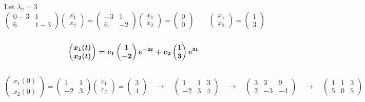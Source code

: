 \documentclass[12pt]{article}
\begin{document}
Let $\lambda_2 = 3$
$$\begin{pmatrix}
	0 - 3  & 1 \\
	6 & 1 - 3
\end{pmatrix}
\begin{pmatrix}
	x_1 \\
	x_2
\end{pmatrix} = 
\begin{pmatrix}
	-3 & 1 \\
	6 & -2
\end{pmatrix}
\begin{pmatrix}
	x_1 \\
	x_2
\end{pmatrix} = 
\begin{pmatrix}
	0 \\
	0
\end{pmatrix} \qquad 
\begin{pmatrix}
	x_1 \\
	x_2
\end{pmatrix} = 
\begin{pmatrix}
	1 \\
	3
\end{pmatrix}$$ \\
$$
\boldmath
\begin{pmatrix}
	x_1(t) \\
	x_2(t)
\end{pmatrix} = 
c_1
\begin{pmatrix}
	1 \\
	-2
\end{pmatrix}
e^{-2t} + 
c_2
\begin{pmatrix}
	1 \\
	3
\end{pmatrix}
e^{3t}
$$
\\
$$
\begin{pmatrix}
x_1(0) \\
x_2(0)
\end{pmatrix} = 
\begin{pmatrix}
	1 & 1 \\
	-2 & 3
\end{pmatrix}
\begin{pmatrix}
	c_1 \\
	c_2	
\end{pmatrix} =
\begin{pmatrix}
	3 \\
	4
\end{pmatrix}
\quad \rightarrow \quad
\begin{pmatrix}
	1 & 1 & 3\\
	-2 & 3 & 4
\end{pmatrix} \quad \rightarrow \quad
\begin{pmatrix}
	3 & 3 & 9 \\
	2 & -3 & -4
\end{pmatrix} \quad \rightarrow \quad
\begin{pmatrix}
	1 & 1 & 3 \\
	5 & 0 & 5
\end{pmatrix}
$$ \\
\end{document}
